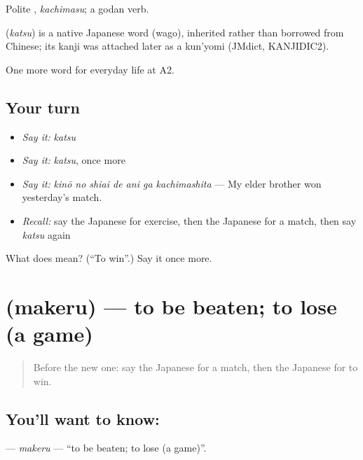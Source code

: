 Polite \textbf{}, \emph{kachimasu}; a godan verb.

\begin{cousinweb}
\textbf{} (\emph{katsu}) is a native Japanese word (wago), inherited rather than borrowed from Chinese; its kanji was attached later as a kun'yomi (JMdict, KANJIDIC2).
\end{cousinweb}

\begin{grammarlens}[title={What you've built}]
One more word for everyday life at A2.
\end{grammarlens}

\subsection*{Your turn}
\begin{itemize}
\raggedright
  \item \emph{Say it:} \emph{katsu}
  \item \emph{Say it:} \emph{katsu}, once more
  \item \emph{Say it:} \emph{kinō no shiai de ani ga kachimashita} — My elder brother won yesterday's match.
  \item \emph{Recall:} say the Japanese for exercise, then the Japanese for a match, then say \emph{katsu} again
\end{itemize}

\begin{tcolorbox}[breakable,colback=teal!4,colframe=teal!35!black,title={Before you move on}]
What does  mean? (\textquotedblleft{}To win\textquotedblright{}.) Say it once more.
\end{tcolorbox}
\section[\texorpdfstring{\ja{まける} (makeru)}{まける (makeru)}]{ (makeru) — to be beaten; to lose (a game)}

\label{lesson:JA-C234-makeru}



\begin{quote}
Before the new one: say the Japanese for a match, then the Japanese for to win.
\end{quote}

\subsection*{You'll want to know: }
\textbf{} — \emph{makeru} — \textquotedblleft{}to be beaten; to lose (a game)\textquotedblright{}.

